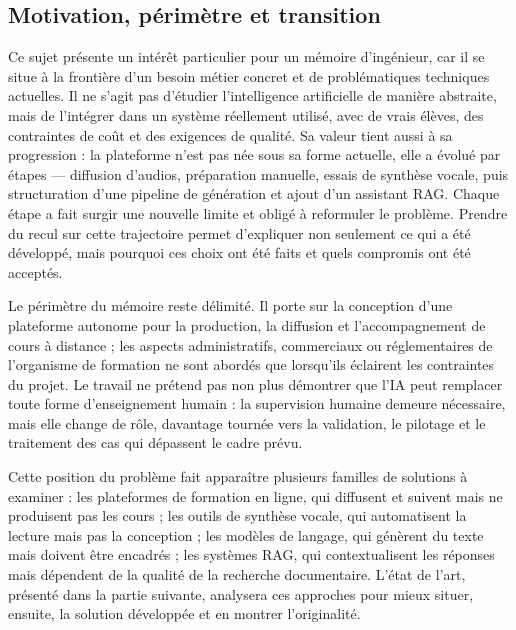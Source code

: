 \subsection{Motivation, périmètre et transition}

Ce sujet présente un intérêt particulier pour un mémoire d'ingénieur, car il se situe à la
frontière d'un besoin métier concret et de problématiques techniques actuelles. Il ne s'agit
pas d'étudier l'intelligence artificielle de manière abstraite, mais de l'intégrer dans un
système réellement utilisé, avec de vrais élèves, des contraintes de coût et des exigences de
qualité. Sa valeur tient aussi à sa progression : la plateforme n'est pas née sous sa forme
actuelle, elle a évolué par étapes — diffusion d'audios, préparation manuelle, essais de
synthèse vocale, puis structuration d'une pipeline de génération et ajout d'un assistant
RAG. Chaque étape a fait surgir une nouvelle limite et obligé à reformuler le problème.
Prendre du recul sur cette trajectoire permet d'expliquer non seulement ce qui a été
développé, mais pourquoi ces choix ont été faits et quels compromis ont été acceptés.

Le périmètre du mémoire reste délimité. Il porte sur la conception d'une plateforme
autonome pour la production, la diffusion et l'accompagnement de cours à distance ; les
aspects administratifs, commerciaux ou réglementaires de l'organisme de formation ne sont
abordés que lorsqu'ils éclairent les contraintes du projet. Le travail ne prétend pas non
plus démontrer que l'IA peut remplacer toute forme d'enseignement humain : la
supervision humaine demeure nécessaire, mais elle change de rôle, davantage tournée vers
la validation, le pilotage et le traitement des cas qui dépassent le cadre prévu.

Cette position du problème fait apparaître plusieurs familles de solutions à examiner :
les plateformes de formation en ligne, qui diffusent et suivent mais ne produisent pas les
cours ; les outils de synthèse vocale, qui automatisent la lecture mais pas la conception ;
les modèles de langage, qui génèrent du texte mais doivent être encadrés ; les systèmes
RAG, qui contextualisent les réponses mais dépendent de la qualité de la recherche
documentaire. L'état de l'art, présenté dans la partie suivante, analysera ces approches
pour mieux situer, ensuite, la solution développée et en montrer l'originalité.
